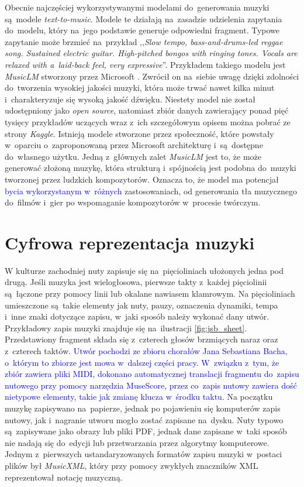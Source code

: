 \documentclass[data-science]{agh-wi} %
\begin{document}
Obecnie najczęściej wykorzystywanymi modelami do~generowania muzyki są~modele \textit{text-to-music}. Modele te działają na~zasadzie udzielenia zapytania do~modelu, który na~jego podstawie generuje odpowiedni fragment. Typowe zapytanie może brzmieć na~przykład ,,\textit{Slow tempo, bass-and-drums-led reggae song. Sustained electric guitar. High-pitched bongos with ringing tones. Vocals are relaxed with a~laid-back feel, very expressive}''. Przykładem takiego modelu jest \textit{MusicLM} stworzony przez Microsoft \cite*{agostinelli2023musiclm}. Zwrócił on na~siebie uwagę dzięki zdolności do~tworzenia wysokiej jakości muzyki, która może trwać nawet kilka minut i~charakteryzuje się wysoką jakość dźwięku. Niestety model nie został udostępniony jako \textit{open source}, natomiast zbiór danych zawierający ponad pięć tysięcy przykładów uczących wraz z~ich szczegółowym opisem można pobrać ze strony \textit{Kaggle}. Istnieją modele stworzone przez społeczność, które powstały w~oparciu o~zaproponowaną przez Microsoft architekturę i~są~dostępne do~własnego użytku. Jedną z~głównych zalet \textit{MusicLM} jest to, że może generować złożoną muzykę, która strukturą i~spójnością jest podobna do~muzyki tworzonej przez ludzkich kompozytorów. Oznacza to, że model ma potencjał \textcolor{blue}{bycia wykorzystanym w~różnych} zastosowaniach, od generowania tła muzycznego do~filmów i~gier po wspomaganie kompozytorów w~procesie twórczym.


\section{Cyfrowa reprezentacja muzyki}\label{sec:muzyka_cyfrowa}
W kulturze zachodniej nuty zapisuje się na~pięcioliniach ułożonych jedna pod drugą. Jeśli muzyka jest wielogłosowa, pierwsze takty z~każdej pięciolinii są~łączone przy pomocy linii lub okalane nawiasem klamrowym. Na pięcioliniach umieszczone są~takie elementy jak nuty, pauzy, oznaczenia dynamiki, tempa i~inne znaki dotyczące zapisu, w~jaki sposób należy wykonać dany utwór. Przykładowy zapis muzyki znajduje się na~ilustracji \ref*{fig:jsb_sheet}. Przedstawiony fragment składa się z~czterech głosów brzmiących naraz oraz z~czterech taktów. \textcolor{blue}{Utwór pochodzi ze zbioru chorałów Jana Sebastiana Bacha, o~którym to zbiorze jest mowa w~dalszej części pracy. W~związku z~tym, że zbiór zawiera pliki MIDI, dokonano automatycznej translacji fragmentu do~zapisu nutowego przy pomocy narzędzia MuseScore, przez co~zapis nutowy zawiera dość nietypowe elementy, takie jak zmianę klucza w~środku taktu.} Na początku muzykę zapisywano na~papierze, jednak po pojawieniu się komputerów zapis nutowy, jak i~nagranie utworu mogło zostać zapisane na~dysku. Nuty typowo są~zapisywane jako obrazy lub pliki PDF, jednak dane zapisane w~taki sposób nie nadają się do~edycji lub przetwarzania przez algorytmy komputerowe. Jednym z~pierwszych ustandaryzowanych formatów zapisu muzyki w~postaci plików był \textit{MusicXML}, który przy pomocy zwykłych znaczników XML reprezentował notację muzyczną.
\end{document}
